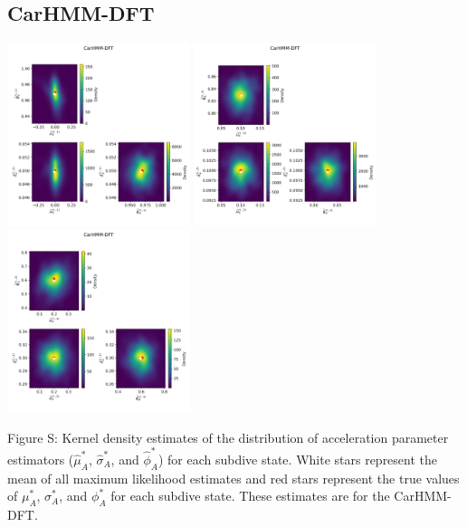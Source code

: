 \documentclass{article}
\begin{document}
        \subsection{CarHMM-DFT}
        \begin{center}
        \includegraphics[width=2.1in]{../Plots/hmm_FV_MLE_density_A_0_0.png}
        \includegraphics[width=2.1in]{../Plots/hmm_FV_MLE_density_A_0_1.png}
        \includegraphics[width=2.1in]{../Plots/hmm_FV_MLE_density_A_0_2.png}
        \end{center}
        
        \noindent Figure S: Kernel density estimates of the distribution of acceleration parameter estimators ($\hat \mu^*_A$, $\hat \sigma^*_A$, and $\hat \phi^*_A$) for each subdive state. White stars represent the mean of all maximum likelihood estimates and red stars represent the true values of $\mu^*_A$, $\sigma^*_A$, and $\phi^*_A$ for each subdive state. These estimates are for the CarHMM-DFT.
        \addtocounter{fignum}{1}
        
\end{document}
